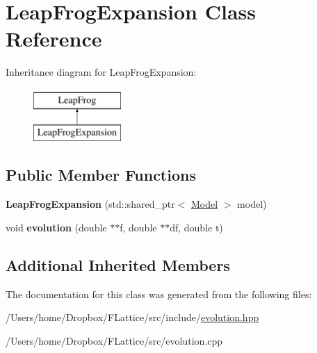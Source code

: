 \hypertarget{class_leap_frog_expansion}{}\section{Leap\+Frog\+Expansion Class Reference}
\label{class_leap_frog_expansion}
Inheritance diagram for Leap\+Frog\+Expansion\+:\begin{figure}[H]
\begin{center}
\leavevmode
\includegraphics[height=2.000000cm]{class_leap_frog_expansion}
\end{center}
\end{figure}
\subsection*{Public Member Functions}
\begin{DoxyCompactItemize}
\item 
\mbox{\label{class_leap_frog_expansion_a8df00d93429f710e92165aea20e508de}} 
{\bfseries Leap\+Frog\+Expansion} (std\+::shared\+\_\+ptr$<$ \mbox{\hyperlink{class_model}{Model}} $>$ model)
\item 
\mbox{\label{class_leap_frog_expansion_a27854e0461bb73d00876439cf734aff6}} 
void {\bfseries evolution} (double $\ast$$\ast$f, double $\ast$$\ast$df, double t)
\end{DoxyCompactItemize}
\subsection*{Additional Inherited Members}


The documentation for this class was generated from the following files\+:\begin{DoxyCompactItemize}
\item 
/\+Users/home/\+Dropbox/\+F\+Lattice/src/include/\mbox{\hyperlink{evolution_8hpp}{evolution.\+hpp}}\item 
/\+Users/home/\+Dropbox/\+F\+Lattice/src/evolution.\+cpp\end{DoxyCompactItemize}
